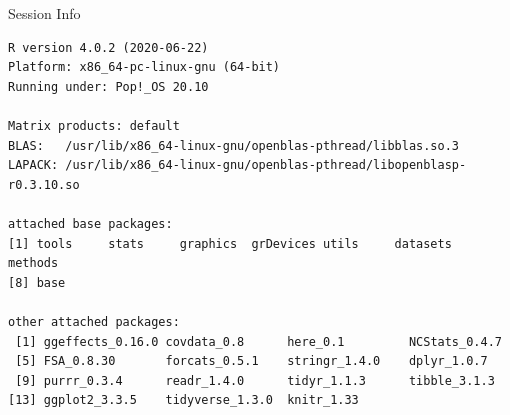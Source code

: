 \documentclass[10pt,handout]{beamer}\usepackage[]{graphicx}\usepackage[]{color}
\makeatletter
\newenvironment{kframe}{%
 \def\at@end@of@kframe{}%
 \ifinner\ifhmode%
  \def\at@end@of@kframe{\end{minipage}}%
  \begin{minipage}{\columnwidth}%
 \fi\fi%
 \def\FrameCommand##1{\hskip\@totalleftmargin \hskip-\fboxsep
 \colorbox{shadecolor}{##1}\hskip-\fboxsep
     \hskip-\linewidth \hskip-\@totalleftmargin \hskip\columnwidth}%
 \MakeFramed {\advance\hsize-\width
   \@totalleftmargin\z@ \linewidth\hsize
   \@setminipage}}%
 {\par\unskip\endMakeFramed%
 \at@end@of@kframe}
\newenvironment{knitrout}{}{} %
\makeatother
\begin{document}


\begin{frame}[fragile]{Session Info}
	\tiny
	
\begin{knitrout}\tiny
{}\color{fgcolor}\begin{kframe}
\begin{verbatim}
R version 4.0.2 (2020-06-22)
Platform: x86_64-pc-linux-gnu (64-bit)
Running under: Pop!_OS 20.10

Matrix products: default
BLAS:   /usr/lib/x86_64-linux-gnu/openblas-pthread/libblas.so.3
LAPACK: /usr/lib/x86_64-linux-gnu/openblas-pthread/libopenblasp-r0.3.10.so

attached base packages:
[1] tools     stats     graphics  grDevices utils     datasets  methods  
[8] base     

other attached packages:
 [1] ggeffects_0.16.0 covdata_0.8      here_0.1         NCStats_0.4.7   
 [5] FSA_0.8.30       forcats_0.5.1    stringr_1.4.0    dplyr_1.0.7     
 [9] purrr_0.3.4      readr_1.4.0      tidyr_1.1.3      tibble_3.1.3    
[13] ggplot2_3.3.5    tidyverse_1.3.0  knitr_1.33      


\end{verbatim}
\end{kframe}
\end{knitrout}
\end{frame}
\end{document}
